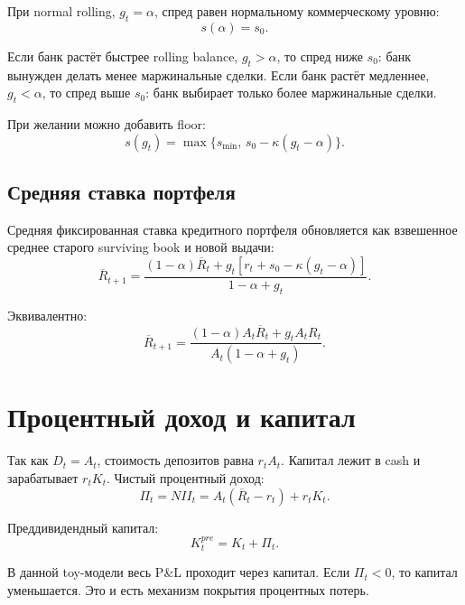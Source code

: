 \documentclass[11pt,a4paper]{article}
\newcommand{\1}{\mathbf{1}}
\begin{document}
При normal rolling, $g_t=\alpha$, спред равен нормальному коммерческому уровню:
\begin{equation}
    s(\alpha)=s_0.
\end{equation}

Если банк растёт быстрее rolling balance, $g_t>\alpha$, то спред ниже $s_0$: банк вынужден делать менее маржинальные сделки. Если банк растёт медленнее, $g_t<\alpha$, то спред выше $s_0$: банк выбирает только более маржинальные сделки.

При желании можно добавить floor:
\begin{equation}
    s(g_t)=\max\{s_{\min},\,s_0-\kappa(g_t-\alpha)\}.
\end{equation}

\subsection{Средняя ставка портфеля}

Средняя фиксированная ставка кредитного портфеля обновляется как взвешенное среднее старого surviving book и новой выдачи:
\begin{equation}
    \overline{R}_{t+1}
    =
    \frac{(1-\alpha)\overline{R}_t + g_t\left[r_t+s_0-\kappa(g_t-\alpha)\right]}
    {1-\alpha+g_t}.
\end{equation}

Эквивалентно:
\begin{equation}
    \overline{R}_{t+1}
    =
    \frac{(1-\alpha)A_t\overline{R}_t + g_tA_t R_t}
    {A_t(1-\alpha+g_t)}.
\end{equation}

\section{Процентный доход и капитал}

Так как $D_t=A_t$, стоимость депозитов равна $r_tA_t$. Капитал лежит в cash и зарабатывает $r_tK_t$. Чистый процентный доход:
\begin{equation}
    \Pi_t = NII_t = A_t(\overline{R}_t-r_t)+r_tK_t.
\end{equation}

Преддивидендный капитал:
\begin{equation}
    K_t^{pre}=K_t+\Pi_t.
\end{equation}

В данной toy-модели весь P\&L проходит через капитал. Если $\Pi_t<0$, то капитал уменьшается. Это и есть механизм покрытия процентных потерь.
\end{document}
